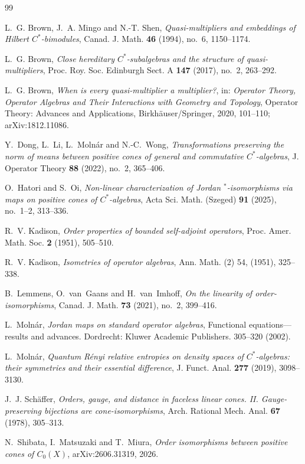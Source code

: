 \documentclass[12pt]{amsart}
\theoremstyle{remark}
\begin{document}
\begin{thebibliography}{99}

L.~G. Brown, J.~A. Mingo and N.-T. Shen,
\textit{Quasi-multipliers and embeddings of Hilbert $C^*$-bimodules},
Canad. J. Math. \textbf{46} (1994), no.~6, 1150--1174.

L.~G. Brown,
\textit{Close hereditary $C^*$-subalgebras and the structure of
quasi-multipliers},
Proc. Roy. Soc. Edinburgh Sect. A \textbf{147} (2017), no.~2,
263--292.

L.~G. Brown,
\textit{When is every quasi-multiplier a multiplier?},
in: \textit{Operator Theory, Operator Algebras and Their Interactions
with Geometry and Topology}, Operator Theory: Advances and
Applications, Birkh\"auser/Springer, 2020, 101--110;
arXiv:1812.11086.



Y.~Dong, L.~Li, L.~Moln\'ar and N.-C.~Wong,
\textit{Transformations preserving the norm of means between positive
cones of general and commutative $C^*$-algebras},
J. Operator Theory \textbf{88} (2022), no.~2, 365--406.

O.~Hatori and S.~Oi,
\textit{Non-linear characterization of Jordan $^*$-isomorphisms
via maps on positive cones of $C^*$-algebras},
Acta Sci. Math. (Szeged) \textbf{91} (2025), no.~1--2, 313--336.

R.~V. Kadison,
\textit{Order properties of bounded self-adjoint operators},
Proc. Amer. Math. Soc. \textbf{2} (1951), 505--510.

R.~V. Kadison,
\textit{Isometries of operator algebras},
Ann. Math. (2) 54, (1951), 325--338.

B.~Lemmens, O.~van~Gaans and H.~van~Imhoff,
\textit{On the linearity of order-isomorphisms},
Canad. J. Math. \textbf{73} (2021), no.~2, 399--416.

L.~Moln\'ar,
\textit{Jordan maps on standard operator algebras},
Functional equations---results and advances. Dordrecht: Kluwer Academic Publishers. 305--320 (2002).

L.~Moln\'ar,
\textit{Quantum R\'enyi relative entropies on density spaces of
$C^*$-algebras: their symmetries and their essential difference},
J. Funct. Anal. \textbf{277} (2019), 3098--3130.

J.~J. Sch\"affer,
\textit{Orders, gauge, and distance in faceless linear cones. II.
Gauge-preserving bijections are cone-isomorphisms},
Arch. Rational Mech. Anal. \textbf{67} (1978), 305--313.


N.~Shibata, I.~Matsuzaki and T.~Miura,
\textit{Order isomorphisms between positive cones of $C_0(X)$},
arXiv:2606.31319, 2026.



\end{thebibliography}
\end{document}
